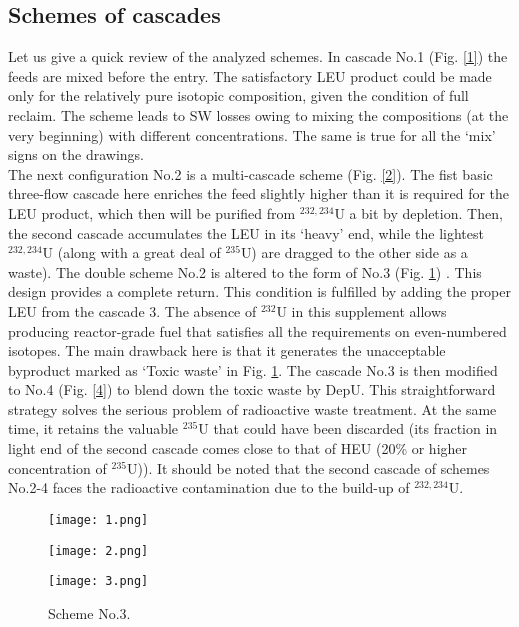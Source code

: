 \documentclass[a4paper]{jpconf}
\begin{document}
\subsection{Schemes of cascades}
Let us give a quick review of the analyzed schemes.
In cascade No.1 (Fig. \ref{1}) the feeds are mixed before the entry. The satisfactory LEU product could be made only for the relatively pure isotopic composition, given the condition of full reclaim. The scheme leads to SW losses owing to mixing the compositions (at the very beginning) with different concentrations. The same is true for all the `mix' signs on the drawings.\\
The next configuration No.2 is a multi-cascade scheme (Fig. \ref{2}). The fist basic three-flow cascade here enriches the feed slightly higher than it is required for the LEU product, which then will be purified from $^{232,234}$U a bit by depletion. Then, the second cascade accumulates the LEU in its `heavy' end, while the lightest $^{232,234}$U (along with a great deal of $^{235}$U) are dragged to the other side as a waste).
The double scheme No.2 is altered to the form of No.3 (Fig. \ref{3}) \cite{MEPhI2018}. This design provides a complete return. This condition is fulfilled by adding the proper LEU from the cascade 3. The absence of $^{232}$U in this supplement allows producing reactor-grade fuel that satisfies all the requirements on even-numbered isotopes. The main drawback here is that it generates the unacceptable byproduct marked as `Toxic waste' in Fig. \ref{3}.
The cascade No.3 is then modified to No.4 (Fig. \ref{4}) \cite{doi:10.1063/1.5099598} to blend down the toxic waste by DepU. This straightforward strategy solves the serious problem of radioactive waste treatment. At the same time, it retains the valuable $^{235}$U that could have been discarded (its fraction in light end of the second cascade comes close to that of HEU (20\% or higher concentration of $^{235}$U)). It should be noted that the second cascade of schemes No.2-4 faces the radioactive contamination due to the build-up of $^{232,234}$U.

\begin{figure}[h]
\begin{minipage}{10pc}
\texttt{[image: 1.png]}
\caption{\label{1}Scheme No.1.}
\end{minipage}\hspace{1pc}%
\begin{minipage}{11pc}
\texttt{[image: 2.png]}
\caption{\label{2}Scheme No.2.}
\end{minipage}\hspace{1pc}%
\begin{minipage}{15pc}
\texttt{[image: 3.png]}
\caption{\label{3}Scheme No.3.}
\end{minipage}
\end{figure}
\end{document}
